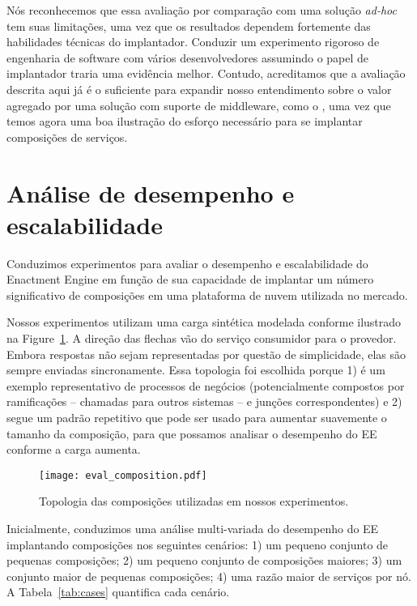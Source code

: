 Nós reconhecemos que essa avaliação por comparação com uma solução \emph{ad-hoc}
tem suas limitações, uma vez que os resultados dependem fortemente das
habilidades técnicas do implantador.
Conduzir um experimento rigoroso de engenharia de software com vários
desenvolvedores assumindo o papel de implantador traria uma evidência melhor.
Contudo, acreditamos que a avaliação descrita aqui já é o suficiente
para expandir nosso entendimento sobre o valor agregado por uma solução
com suporte de middleware, como o \ee, uma vez que temos agora uma boa ilustração
do esforço necessário para se implantar composições de serviços.

\section{Análise de desempenho e escalabilidade}

Conduzimos experimentos para avaliar o desempenho e escalabilidade do
Enactment Engine em função de sua capacidade de implantar um número significativo
de composições em uma plataforma de nuvem utilizada no mercado.

Nossos experimentos utilizam uma carga sintética modelada conforme ilustrado na Figure~\ref{fig:eval_composition}.
A direção das flechas vão do serviço consumidor para o provedor.
Embora respostas não sejam representadas por questão de simplicidade,
elas são sempre enviadas sincronamente.
Essa topologia foi escolhida porque 1) é um exemplo representativo de processos de negócios
(potencialmente compostos por ramificações -- chamadas para outros sistemas -- e junções correspondentes)
e 2) segue um padrão repetitivo que pode ser usado para aumentar suavemente o tamanho da composição,
para que possamos analisar o desempenho do EE conforme a carga aumenta.


\begin{figure}[h]
  \centering
  \texttt{[image: eval\_composition.pdf]}
  \caption{Topologia das composições utilizadas em nossos experimentos.}
  \label{fig:eval_composition}
\end{figure}


Inicialmente, conduzimos uma análise multi-variada 
do desempenho do EE implantando composições nos seguintes cenários:
1) um pequeno conjunto de pequenas composições;
2) um pequeno conjunto de composições maiores;
3) um conjunto maior de pequenas composições;
4) uma razão maior de serviços por nó.
A Tabela~\ref{tab:cases} quantifica cada cenário.

